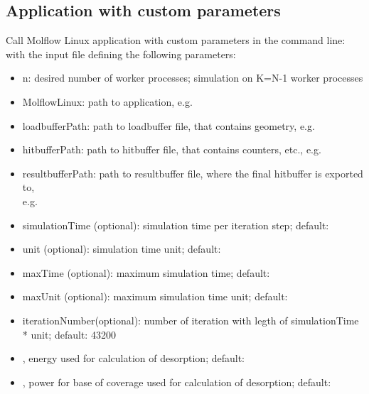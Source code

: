 \subsection{Application with custom parameters}
Call Molflow Linux application with custom parameters in the command line:
\smallskip
with the input file defining the following parameters:
\begin{itemize}[noitemsep,topsep=0pt]
\item n: desired number of worker processes; simulation on K=N-1 worker processes
\item MolflowLinux: path to application, e.g.\ 
\item loadbufferPath: path to loadbuffer file, that contains geometry, e.g.\ 
\item hitbufferPath: path to hitbuffer file, that contains counters, etc., e.g.\ 
\item resultbufferPath: path to resultbuffer file, where the final hitbuffer is exported to,\\ e.g.\ 
\item simulationTime (optional): simulation time per iteration step; default: 
\item unit (optional): simulation time unit; default: 
\item maxTime (optional): maximum simulation time; default: 
\item maxUnit (optional): maximum simulation time unit; default: 
\item iterationNumber(optional): number of iteration with legth of simulationTime * unit; default: 43200
\item {}, energy used for calculation of desorption; default:
\item{}, power for base of coverage used for calculation of desorption; default:
\end{itemize}

